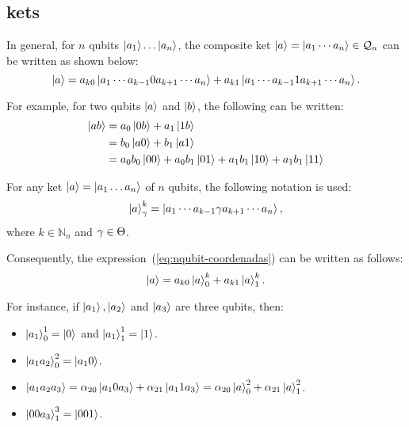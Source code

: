\subsection{kets}

In general, for $n$ qubits $\ket{a_1}\dots\ket{a_n}$, the composite ket  $\ket{a}=\ket{a_1\cdots a_n}\in\mathcal{Q}_n$  can be written as shown below:
\begin{equation}
	\label{eq:nqubit-coordenadas}
	\ket{a}=a_{k0}\ket{a_1\cdots a_{k-1}0a_{k+1}\cdots a_n}+a_{k1}\ket{a_1\cdots a_{k-1}1a_{k+1}\cdots a_n}.
\end{equation}

For example, for two qubits $\ket{a}$ and $\ket{b}$, the following can be written:
\begin{align}
	\ket{ab}&=a_0\ket{0b}+a_1\ket{1b}\\
	&=b_0\ket{a0}+b_1\ket{a1}\\
	\label{eq:2qubit-coordenadas}
	&=a_0 b_0\ket{00}+a_0 b_1\ket{01}+a_1 b_1\ket{10}+a_1 b_1\ket{11}
\end{align}

\begin{notation}
	For any ket $\ket{a}=\ket{a_1\dots a_n}$ of $n$ qubits, the following notation is used:
	\begin{equation}
		\label{eq:nqubit-only-one-state}
		\ket{a}^{k}_{\gamma} = \ket{a_1\cdots a_{k-1}\gamma a_{k+1}\cdots a_n},
	\end{equation}
	where $k \in \mathbb{N}_n$ and $\gamma\in\Theta$.
\end{notation}

Consequently, the expression~(\ref{eq:nqubit-coordenadas}) can be written as follows:
\begin{equation}
	\label{eq:canonical-state}
	\ket{a}= a_{k0}\ket{a}^{k}_{0}+a_{k1}\ket{a}^{k}_{1}.
\end{equation}

For instance, if $\ket{a_1},\ket{a_2}$ and $\ket{a_3}$ are three qubits, then:
\begin{itemize}
	\item $\ket{a_1}^{1}_{0}=\ket{0}$ and $\ket{a_1}^{1}_{1}=\ket{1}$.
	\item $\ket{a_1 a_2}^{2}_{0}=\ket{a_1 0}$.
	\item $\ket{a_1 a_2 a_3}=\alpha_{20}\ket{a_1 0 a_3}+\alpha_{21}\ket{a_1 1 a_3}=\alpha_{20}\ket{a}^{2}_{0}+\alpha_{21}\ket{a}^{2}_{1}$.
	\item $\ket{00a_3}^{3}_{1}=\ket{001}$.
\end{itemize}

